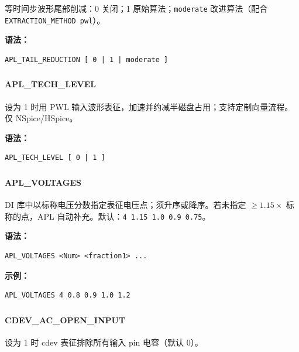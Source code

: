 等时间步波形尾部削减：0 关闭；1 原始算法；\texttt{moderate} 改进算法（配合 \texttt{EXTRACTION\_METHOD pwl}）。

\textbf{语法：}
\begin{lstlisting}
APL_TAIL_REDUCTION [ 0 | 1 | moderate ]
\end{lstlisting}

\subsubsection{}
\paragraph*{APL_TECH_LEVEL}

设为 1 时用 PWL 输入波形表征，加速并约减半磁盘占用；支持定制向量流程。仅 NSpice/HSpice。

\textbf{语法：}
\begin{lstlisting}
APL_TECH_LEVEL [ 0 | 1 ]
\end{lstlisting}

\subsubsection{}
\paragraph*{APL_VOLTAGES}

DI 库中以标称电压分数指定表征电压点；须升序或降序。若未指定 $\ge 1.15\times$ 标称的点，APL 自动补充。默认：\texttt{4 1.15 1.0 0.9 0.75}。

\textbf{语法：}
\begin{lstlisting}
APL_VOLTAGES <Num> <fraction1> ...
\end{lstlisting}

\textbf{示例：}
\begin{lstlisting}
APL_VOLTAGES 4 0.8 0.9 1.0 1.2
\end{lstlisting}

\subsubsection{}
\paragraph*{CDEV_AC_OPEN_INPUT}

设为 1 时 cdev 表征排除所有输入 pin 电容（默认 0）。


